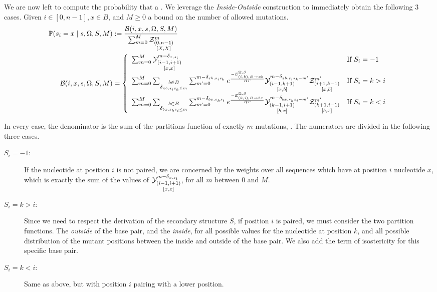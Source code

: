 We are now left to compute the probability that a .
We leverage the \emph{Inside-Outside} construction to immediately obtain the following $3$ cases.
Given $i\in[0,n-1],x\in B$, and $M\geq 0$ a bound on the number of allowed mutations. 
\begin{align*}
	\mathbb{P}(s_i = x\mid s,\Omega, S,M) &:= \frac{\mathcal{B}(i,x,s,\Omega,S,M)}{\sum_{m=0}^{M}\Z{0,n-1}{m}{X,X}}\\ 
\mathcal{B}(i,x,s,\Omega,S,M)&=
 \left\{
	\begin{array}{ll}
			\sum_{m=0}^{M}
			\Y{i-1,i+1}{m-\Kron_{x,s_i}}{x,x}
		&\text{If }S_i = -1\\
			\sum_{m=0}^{M}
			\sum_{\substack{b\in B\\\Kron_{xb,s_is_k\leq m}}}
			\sum_{m'=0}^{m-\Kron_{xb,s_is_k}}
     	 e^{\frac{-E_{(i,k),\varnothing\to xb}^{\Omega,\beta} }{RT}}
			\Y{i-1,k+1}{m-\Kron_{xb,s_is_k-m'}}{x,b}
			\Z{i+1,k-1}{m'}{x,b}
		&\text{If }S_i=k>i\\
			\sum_{m=0}^{M}
			\sum_{\substack{b\in B\\\Kron_{bx,s_ks_i\leq m}}}
			\sum_{m'=0}^{m-\Kron_{bx,s_ks_i}}
     	 e^{\frac{-E^{\Omega, \beta}_{(k,i),\varnothing\to bx}}{RT}}
			\Y{k-1,i+1}{m-\Kron_{bx,s_ks_i-m'}}{b,x}
			\Z{k+1,i-1}{m'}{b,x}
		&\text{If }S_i=k<i
	\end{array}\right.
\end{align*}

In every case, the denominator is the sum of the partitions function of exactly $m$ mutations, . The numerators are divided in the following three cases.
\begin{description}
\item[$S_i=-1$:] If the nucleotide at position $i$ is not paired, we are concerned by the weights
over all sequences which have at position $i$ nucleotide $x$, which is exactly the sum
of the values of $\Y{i-1,i+1}{m-\Kron_{x,s_i}}{x,x}$, for all $m$ between $0$ and $M$.
\item[$S_i=k>i$:] Since we need to respect the derivation of the secondary structure $S$, if 
position $i$ is paired, we must consider the two partition functions. The \emph{outside} of the 
base pair, and the \emph{inside}, for all possible values for the nucleotide at position $k$, and
all possible distribution of the mutant positions between the inside and outside of the base pair. We also add the term of isostericity for this specific base pair.
\item[$S_i=k<i$:] Same as above, but with position $i$ pairing with a lower position.
\end{description}